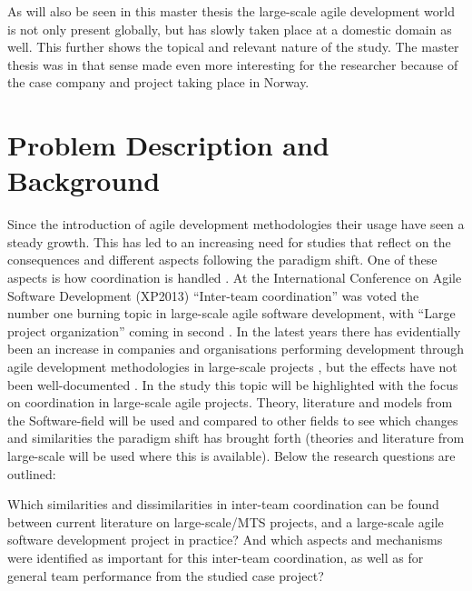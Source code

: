 As will also be seen in this master thesis the large-scale agile development world is not only present globally, but has slowly taken place at a domestic domain as well. This further shows the topical and relevant nature of the study. The master thesis was in that sense made even more interesting for the researcher because of the case company and project taking place in Norway.

\section{Problem Description and Background}
\label{pdab}

Since the introduction of agile development methodologies their usage have seen a steady growth. This has led to an increasing need for studies that reflect on the consequences and different aspects following the paradigm shift. One of these aspects is how coordination is handled \cite{Agerfalk2006, Leffingwell2007, Cockburn2002, Batra2010}. At the International Conference on Agile Software Development (XP2013) ``Inter-team coordination'' was voted the number one burning topic in large-scale agile software development, with ``Large project organization'' coming in second \cite{Dingsoyr2013b}.  In the latest years there has evidentially been an increase in companies and organisations performing development through agile development methodologies in large-scale projects \cite{Paasivaara2012, Com2013, Vlietland2015, Lindvall2004, Dingsoyr2013b, Lee2008, Paasivaara2009}, but the effects have not been well-documented \cite{Pikkarainen2008, Paasivaara2012, Freudenberg2010, Haaster2014, Dingsoyr2013a, Reifer2003}. In the study this topic will be highlighted with the focus on coordination in large-scale agile projects. Theory, literature and models from the Software-field will be used and compared to other fields to see which changes and similarities the paradigm shift has brought forth (theories and literature from large-scale will be used where this is available). Below the research questions are outlined:

\begin{fancyquotes}
Which similarities and dissimilarities in inter-team coordination can be found between current literature on large-scale/MTS projects, and a large-scale agile software development project in practice? And which aspects and mechanisms were identified as important for this inter-team coordination, as well as for general team performance from the studied case project?
\end{fancyquotes}

